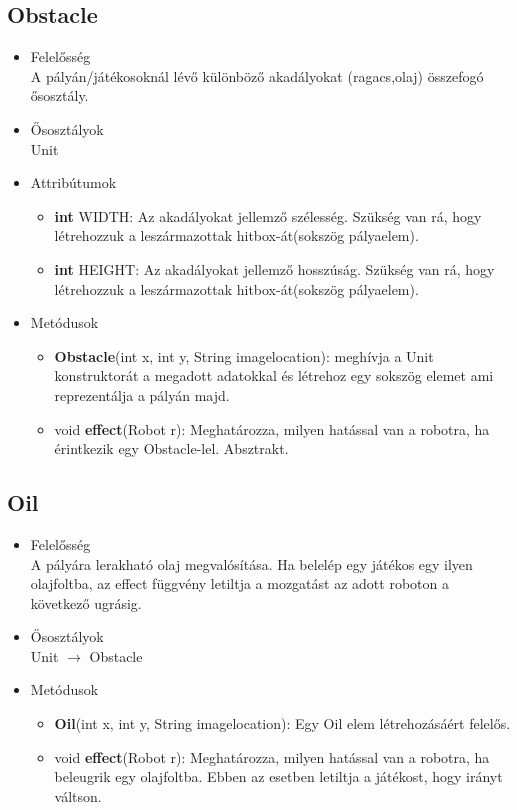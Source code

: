 \subsection{Obstacle}
\begin{itemize}
\item Felelősség\\
A pályán/játékosoknál lévő különböző akadályokat (ragacs,olaj) összefogó ősosztály.
\item Ősosztályok\\
Unit
\item Attribútumok
	\begin{itemize}
		\item \textbf{int} WIDTH: Az akadályokat jellemző szélesség. Szükség van rá, hogy létrehozzuk a leszármazottak hitbox-át(sokszög pályaelem).
		\item \textbf{int} HEIGHT: Az akadályokat jellemző hosszúság. Szükség van rá, hogy létrehozzuk a leszármazottak hitbox-át(sokszög pályaelem).
	\end{itemize}
\item Metódusok
	\begin{itemize}
		\item \textbf{Obstacle}(int x, int y, String imagelocation): meghívja a Unit konstruktorát a megadott adatokkal és létrehoz egy sokszög elemet ami reprezentálja a pályán majd.
		\item void \textbf{effect}(Robot r): Meghatározza, milyen hatással van a robotra, ha érintkezik egy Obstacle-lel. Absztrakt.
	\end{itemize}
\end{itemize}

\subsection{Oil}
\begin{itemize}
\item Felelősség\\
A pályára lerakható olaj megvalósítása. Ha belelép egy játékos egy ilyen olajfoltba, az effect függvény letiltja a mozgatást az adott roboton a következő ugrásig.
\item Ősosztályok\\
Unit $\rightarrow$ Obstacle 
\item Metódusok
	\begin{itemize}
		\item \textbf{Oil}(int x, int y, String imagelocation): Egy Oil elem létrehozásáért felelős.
		\item void \textbf{effect}(Robot r): Meghatározza, milyen hatással van a robotra, ha beleugrik egy olajfoltba. Ebben az esetben letiltja a játékost, hogy irányt váltson.
	\end{itemize}
\end{itemize}

